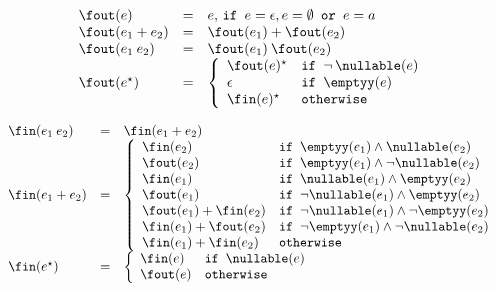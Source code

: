\[
\begin{array}{lcl}
   \fout(e) & = & e,\,\texttt{if } e = \epsilon, e = \emptyset \texttt{ or } e = a\\
   \fout(e_1 + e_2) & = & \fout(e_1) + \fout(e_2) \\
   \fout(e_1\:e_2) & = & \fout(e_1)\:\fout(e_2)\\
   \fout(e^\star) & = & \left\{
        \begin{array}{ll}
           \fout(e)^\star & \texttt{if } \neg\,\nullable(e)\\
           \epsilon       & \texttt{if } \emptyy(e)\\
           \fin(e)^\star  & \texttt{otherwise}
        \end{array}
                          \right.
\end{array}
\]




\[
\begin{array}{lcl}
   \fin(e_1\:e_2) & = & \fin(e_1+e_2)\\
   \fin(e_1 + e_2) & = & \left\{
             \begin{array}{ll}
                \fin(e_2)  & \texttt{if }\emptyy(e_1) \land \nullable(e_2)\\
                \fout(e_2) & \texttt{if }\emptyy(e_1) \land \neg \nullable(e_2)\\
                \fin(e_1)  & \texttt{if }\nullable(e_1) \land \emptyy(e_2)\\
                \fout(e_1) & \texttt{if }\neg \nullable(e_1) \land \emptyy(e_2)\\
                \fout(e_1) + \fin(e_2) & \texttt{if }\neg \nullable(e_1) \land \neg\emptyy(e_2)\\
                \fin(e_1) + \fout(e_2) & \texttt{if }\neg \emptyy(e_1) \land \neg \nullable(e_2)\\
                \fin(e_1) + \fin(e_2) & \texttt{otherwise}
             \end{array}
                         \right. \\
   \fin(e^\star) & = & \left\{
             \begin{array}{ll}
               \fin(e) & \texttt{if }\nullable(e)\\
               \fout(e) & \texttt{otherwise}\\
             \end{array}
                       \right.
\end{array}
\]



